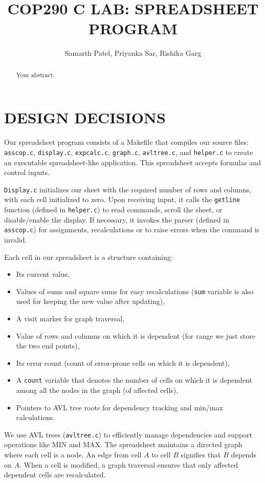 \documentclass[a4paper]{article}
\title{COP290 C LAB: SPREADSHEET PROGRAM}
\author{Samarth Patel, Priyanka Sar, Rishika Garg}
\begin{document}
\maketitle

\begin{abstract}
Your abstract.
\end{abstract}

\section{DESIGN DECISIONS}

Our spreadsheet program consists of a Makefile that compiles our source files: \texttt{asscop.c}, \texttt{display.c}, \texttt{expcalc.c}, \texttt{graph.c}, \texttt{avltree.c}, and \texttt{helper.c} to create an executable spreadsheet-like application. This spreadsheet accepts formulas and control inputs.

\texttt{Display.c} initializes our sheet with the required number of rows and columns, with each cell initialized to zero. Upon receiving input, it calls the \texttt{getline} function (defined in \texttt{helper.c}) to read commands, scroll the sheet, or disable/enable the display. If necessary, it invokes the parser (defined in \texttt{asscop.c}) for assignments, recalculations or to raise errors when the command is invalid. 

Each cell in our spreadsheet is a structure containing:
\begin{itemize}
    \item Its current value,
    \item Values of sums and square sums for easy recalculations (\texttt{sum} variable is also used for keeping the new value after updating),
    \item A visit marker for graph traversal,
    \item Value of rows and columns on which it is dependent (for range we just store the two end points),
    \item Its error count (count of error-prone cells on which it is dependent),
    \item A \texttt{count} variable that denotes the number of cells on which it is dependent among all the nodes in the graph (of affected cells),
    \item Pointers to AVL tree roots for dependency tracking and min/max calculations.
\end{itemize}

We use AVL trees (\texttt{avltree.c}) to efficiently manage dependencies and support operations like MIN and MAX. The spreadsheet maintains a directed graph where each cell is a node. An edge from cell $A$ to cell $B$ signifies that $B$ depends on $A$. When a cell is modified, a graph traversal ensures that only affected dependent cells are recalculated.
\end{document}
